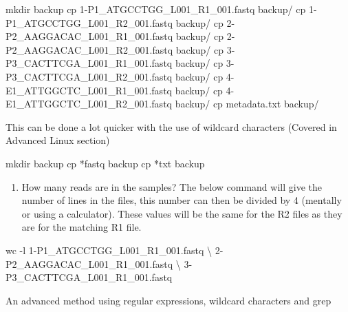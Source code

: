 \documentclass[
  letterpaper,
  DIV=11,
  numbers=noendperiod]{scrreprt}
\newenvironment{Shaded}{\begin{snugshade}}{\end{snugshade}}
\newcommand{\AttributeTok}[1]{\textcolor[rgb]{0.40,0.45,0.13}{#1}}
\newcommand{\DataTypeTok}[1]{\textcolor[rgb]{0.68,0.00,0.00}{#1}}
\newcommand{\FunctionTok}[1]{\textcolor[rgb]{0.28,0.35,0.67}{#1}}
\newcommand{\NormalTok}[1]{\textcolor[rgb]{0.00,0.23,0.31}{#1}}
\newcommand{\PreprocessorTok}[1]{\textcolor[rgb]{0.68,0.00,0.00}{#1}}
\providecommand{\tightlist}{%
  \setlength{\itemsep}{0pt}\setlength{\parskip}{0pt}}\usepackage{longtable,booktabs,array}
\begin{document}
\begin{Shaded}
\begin{Highlighting}[]
\FunctionTok{mkdir}\NormalTok{ backup}
\FunctionTok{cp}\NormalTok{ 1{-}P1\_ATGCCTGG\_L001\_R1\_001.fastq backup/}
\FunctionTok{cp}\NormalTok{ 1{-}P1\_ATGCCTGG\_L001\_R2\_001.fastq backup/}
\FunctionTok{cp}\NormalTok{ 2{-}P2\_AAGGACAC\_L001\_R1\_001.fastq backup/}
\FunctionTok{cp}\NormalTok{ 2{-}P2\_AAGGACAC\_L001\_R2\_001.fastq backup/}
\FunctionTok{cp}\NormalTok{ 3{-}P3\_CACTTCGA\_L001\_R1\_001.fastq backup/}
\FunctionTok{cp}\NormalTok{ 3{-}P3\_CACTTCGA\_L001\_R2\_001.fastq backup/}
\FunctionTok{cp}\NormalTok{ 4{-}E1\_ATTGGCTC\_L001\_R1\_001.fastq backup/}
\FunctionTok{cp}\NormalTok{ 4{-}E1\_ATTGGCTC\_L001\_R2\_001.fastq backup/}
\FunctionTok{cp}\NormalTok{ metadata.txt backup/}
\end{Highlighting}
\end{Shaded}

This can be done a lot quicker with the use of wildcard characters
(Covered in Advanced Linux section)

\begin{Shaded}
\begin{Highlighting}[]
\FunctionTok{mkdir}\NormalTok{ backup}
\FunctionTok{cp} \PreprocessorTok{*}\NormalTok{fastq backup}
\FunctionTok{cp} \PreprocessorTok{*}\NormalTok{txt backup}
\end{Highlighting}
\end{Shaded}

\begin{enumerate}
\def\labelenumi{\arabic{enumi}.}
\setcounter{enumi}{3}
\tightlist
\item
  How many reads are in the samples? The below command will give the
  number of lines in the files, this number can then be divided by 4
  (mentally or using a calculator). These values will be the same for
  the R2 files as they are for the matching R1 file.
\end{enumerate}

\begin{Shaded}
\begin{Highlighting}[]
\FunctionTok{wc} \AttributeTok{{-}l}\NormalTok{ 1{-}P1\_ATGCCTGG\_L001\_R1\_001.fastq }\DataTypeTok{\textbackslash{}}
\NormalTok{2{-}P2\_AAGGACAC\_L001\_R1\_001.fastq }\DataTypeTok{\textbackslash{}}
\NormalTok{3{-}P3\_CACTTCGA\_L001\_R1\_001.fastq}
\end{Highlighting}
\end{Shaded}

An advanced method using regular expressions, wildcard characters and
grep
\end{document}
